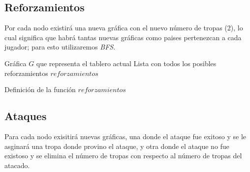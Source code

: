 \documentclass[12pt]{article}
\begin{document}
\subsection{Reforzamientos}

Por cada nodo existir\'a una nueva gr\'afica con el nuevo n\'umero de tropas (2), lo
cual significa que habr\'a tantas nuevas gr\'aficas como paises pertenezcan a cada jugador; para
esto utilizaremos \textit{BFS}.

\begin{algorithm}
\begin{algorithmic}[1]
\REQUIRE Gr\'afica $G$ que representa el tablero actual
\ENSURE Lista con todos los posibles reforzamientos
\ENDFOR
{}
\ENDIF
{}
\ENDIF
{}
\ENDIF
\ENDFOR
\ENDWHILE
\RETURN $reforzamientos$
\end{algorithmic}
\caption{Definici\'on de la funci\'on $reforzamientos$}
\label{reforzamientos}
\end{algorithm}

\subsection{Ataques}

Para cada nodo exisitir\'a nuevas gr\'aficas, una donde el ataque fue exitoso y se le asginar\'a una tropa donde
provino el ataque, y otra donde el ataque no fue existoso y se elimina el n\'umero de tropas con respecto al n\'umero
de tropas del atacado.
\end{document}
